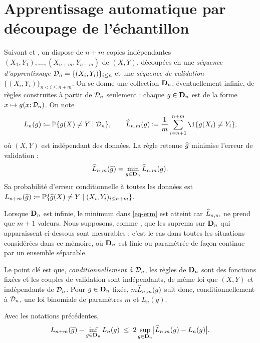 \section{Apprentissage automatique par découpage de l'échantillon}\label{sec-decoupage}

Suivant \citet{devroye1988automatic} et \citet{berlinet2008functional}, on dispose de $n+m$ copies indépendantes $(X_1,Y_1),\dots,(X_{n+m},Y_{n+m})$ de $(X,Y)$, découpées en une \emph{séquence d'apprentissage} $\mathcal{D}_n=\{(X_i,Y_i)\}_{i\le n}$ et une \emph{séquence de validation} $\{(X_i,Y_i)\}_{n<i\le n+m}$. On se donne une collection $\mathbf{D}_n$, éventuellement infinie, de règles construites à partir de $\mathcal{D}_n$ seulement : chaque $g\in\mathbf{D}_n$ est de la forme $x\mapsto g(x;\mathcal{D}_n)$. On note
\[
  L_n(g)\eqdef\PP\{g(X)\neq Y\mid \Dn\},
  \qquad
  \hL_{n,m}(g)\eqdef\frac1m\sum_{i=n+1}^{n+m}\1\{g(X_i)\neq Y_i\},
\]
où $(X,Y)$ est indépendant des données. La règle retenue $\widehat{g}$ minimise l'erreur de validation :
\begin{equation}\label{eq-erm}
  \widehat{L}_{n,m}(\widehat{g}) = \min_{g\in\mathbf{D}_n}\widehat{L}_{n,m}(g).
\end{equation}
Sa probabilité d'erreur conditionnelle à toutes les données est $L_{n+m}(\widehat{g})\coloneqq\mathbb{P}\{\widehat{g}(X)\neq Y\mid (X_i,Y_i)_{i\le n+m}\}$.

\begin{remarque}\label{rem-mesurabilite}
Lorsque $\mathbf{D}_n$ est infinie, le minimum dans \eqref{eq-erm} est atteint car $\widehat{L}_{n,m}$ ne prend que $m+1$ valeurs. Nous supposons, comme \citet{devroye1996probabilistic}, que les suprema sur $\mathbf{D}_n$ qui apparaissent ci-dessous sont mesurables ; c'est le cas dans toutes les situations considérées dans ce mémoire, où $\mathbf{D}_n$ est finie ou paramétrée de façon continue par un ensemble séparable.
\end{remarque}

Le point clé est que, \emph{conditionnellement à $\mathcal{D}_n$}, les règles de $\mathbf{D}_n$ sont des fonctions fixées et les couples de validation sont indépendants, de même loi que $(X,Y)$ et indépendants de $\mathcal{D}_n$. Pour $g\in\mathbf{D}_n$ fixée, $m\widehat{L}_{n,m}(g)$ suit donc, conditionnellement à $\mathcal{D}_n$, une loi binomiale de paramètres $m$ et $L_n(g)$.

\begin{lemme}\label{lem-selection}
Avec les notations précédentes,
\[
  L_{n+m}(\widehat{g}) - \inf_{g\in\mathbf{D}_n}L_n(g) \;\le\; 2\sup_{g\in\mathbf{D}_n}\bigl|\widehat{L}_{n,m}(g)-L_n(g)\bigr|.
\]
\end{lemme}

